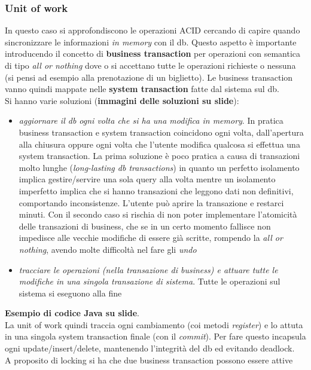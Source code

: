 \documentclass[a4paper,12pt, oneside]{book}
\begin{document}
\subsubsection{Unit of work}
In questo caso si approfondiscono le operazioni ACID cercando di capire quando
sincronizzare le informazioni \textit{in memory} con il db. Questo aspetto è
importante introducendo il concetto di \textbf{business transaction} per
operazioni con semantica di tipo \textit{all or nothing} dove o si accettano
tutte le operazioni richieste o nessuna (si pensi ad esempio alla prenotazione
di un biglietto). Le business transaction vanno quindi mappate nelle
\textbf{system transaction} fatte dal sistema sul db.\\
Si hanno varie soluzioni (\textbf{immagini delle soluzioni su slide}):
\begin{itemize}
  \item \textit{aggiornare il db ogni volta che si ha una modifica in
    memory}. In pratica business transaction e system transaction coincidono
  ogni volta, dall'apertura alla chiusura oppure ogni volta che l'utente
  modifica qualcosa si effettua una system transaction. La prima soluzione è
  poco pratica a causa di transazioni molto lunghe 
  (\textit{long-lasting db transactions}) in quanto un perfetto isolamento
  implica gestire/servire una sola query alla volta mentre un isolamento
  imperfetto implica che si hanno transazioni che leggono dati non definitivi,
  comportando inconsistenze. L'utente può aprire la transazione e restarci
  minuti. Con il secondo caso si rischia di non poter implementare
  l'atomicità delle transazioni di business, che se in un certo momento fallisce
  non impedisce alle vecchie modifiche di essere già scritte, rompendo la
  \textit{all or nothing}, avendo molte difficoltà nel fare gli \textit{undo}
  \item \textit{tracciare le operazioni (nella transazione di business) e
    attuare tutte le modifiche in una singola transazione di sistema}. Tutte le
  operazioni sul sistema si eseguono alla fine 
\end{itemize}
\textbf{Esempio di codice Java su slide}.\\
La unit of work quindi traccia ogni cambiamento (coi metodi \textit{register}) e
lo attuta in una singola 
system transaction finale (con il \textit{commit}). Per fare questo incapsula
ogni update/insert/delete, 
mantenendo l'integrità del db ed evitando deadlock.\\
A proposito di locking si ha che due business transaction possono essere attive
\end{document}
